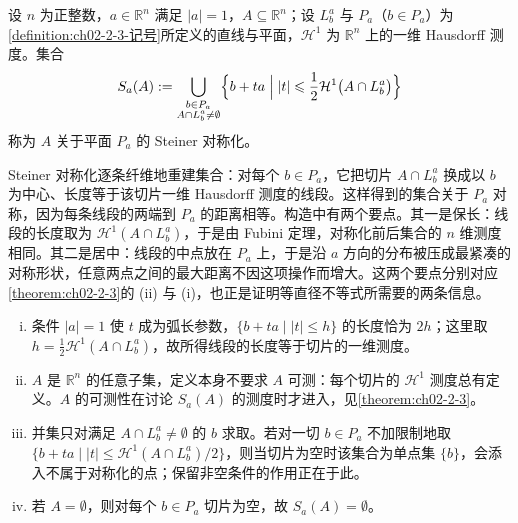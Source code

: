 \documentclass[../../main.tex]{subfiles}%
\begin{document}
\begin{definition}\label{definition:ch02-2-3}
设 $n$ 为正整数，$a\in\mathbb{R}^n$ 满足 $|a|=1$，$A\subseteq\mathbb{R}^n$；设 $L_b^a$ 与 $P_a$（$b\in P_a$）为\cref{definition:ch02-2-3-记号}所定义的直线与平面，$\mathcal{H}^1$ 为 $\mathbb{R}^n$ 上的一维 Hausdorff 测度。集合 %
\begin{align*}
S_a(A):=\bigcup_{\substack{b\in P_a\\ A\cap L_b^a\neq\emptyset}}\Bigl\{b+ta\Bigm| |t|\leqslant\frac{1}{2}\mathcal{H}^1\bigl(A\cap L_b^a\bigr)\Bigr\}
\end{align*}
称为 $A$ 关于平面 $P_a$ 的 Steiner 对称化。
\end{definition}

\begin{remark}\label{remark:ch02-def-2-3-动机}
Steiner 对称化逐条纤维地重建集合：对每个 $b\in P_a$，它把切片 $A\cap L_b^a$ 换成以 $b$ 为中心、长度等于该切片一维 Hausdorff 测度的线段。这样得到的集合关于 $P_a$ 对称，因为每条线段的两端到 $P_a$ 的距离相等。构造中有两个要点。其一是保长：线段的长度取为 $\mathcal{H}^1(A\cap L_b^a)$，于是由 Fubini 定理，对称化前后集合的 $n$ 维测度相同。其二是居中：线段的中点放在 $P_a$ 上，于是沿 $a$ 方向的分布被压成最紧凑的对称形状，任意两点之间的最大距离不因这项操作而增大。这两个要点分别对应\cref{theorem:ch02-2-3}的 (ii) 与 (i)，也正是证明等直径不等式所需要的两条信息。%
\end{remark}

\begin{remark}\label{remark:ch02-def-2-3-条件}
\begin{enumerate}[(i)]
\item 条件 $|a|=1$ 使 $t$ 成为弧长参数，$\{b+ta\mid |t|\leqslant h\}$ 的长度恰为 $2h$；这里取 $h=\frac12\mathcal{H}^1(A\cap L_b^a)$，故所得线段的长度等于切片的一维测度。
\item $A$ 是 $\mathbb{R}^n$ 的任意子集，定义本身不要求 $A$ 可测：每个切片的 $\mathcal{H}^1$ 测度总有定义。$A$ 的可测性在讨论 $S_a(A)$ 的测度时才进入，见\cref{theorem:ch02-2-3}。%
\item 并集只对满足 $A\cap L_b^a\neq\emptyset$ 的 $b$ 求取。若对一切 $b\in P_a$ 不加限制地取 $\{b+ta\mid |t|\leqslant\mathcal{H}^1(A\cap L_b^a)/2\}$，则当切片为空时该集合为单点集 $\{b\}$，会添入不属于对称化的点；保留非空条件的作用正在于此。
\item 若 $A=\emptyset$，则对每个 $b\in P_a$ 切片为空，故 $S_a(A)=\emptyset$。
\end{enumerate}
\end{remark}
\end{document}
